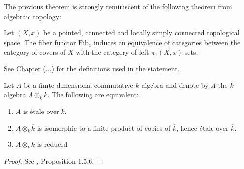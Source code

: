 The previous theorem is strongly reminiscent of the following theorem from algebraic topology:

\begin{theorem}
	Let $(X,x)$ be a pointed, connected and locally simply connected topological space. The fiber functor $\text{Fib}_x$ induces an equivalence of categories between the category of covers of $X$ with the category of left $\pi_1(X,x)$-sets.
\end{theorem}

See Chapter (...) for the definitions used in the statement.

\begin{theorem}
	Let $A$ be a finite dimensional commutative $k$-algebra and denote by $\overline{A}$ the $\overline{k}$-algebra $A \otimes_k \overline{k}$. The following are equivalent:
	\begin{enumerate}
		\item $A$ is \'etale over $k$.\label{etale}
		\item $A \otimes_k \overline{k}$ is isomorphic to a finite product of copies of $\overline{k}$, hence \'etale over $\overline{k}$.\label{product}
		\item $A \otimes_k \overline{k}$ is reduced
	\end{enumerate}
\end{theorem}

\begin{proof}
	See \cite{Szamuely}, Proposition 1.5.6.
\end{proof}


